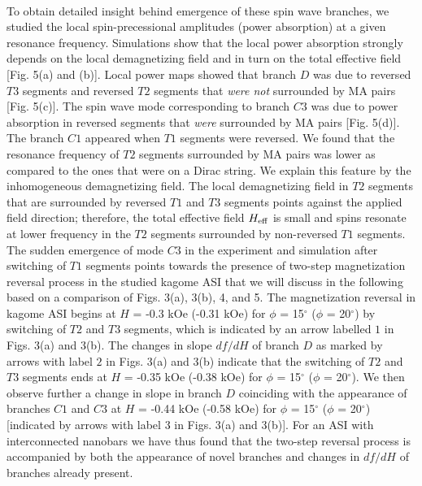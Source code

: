 \documentclass[aps,prl,preprint,showpacs,superscriptaddress,groupedaddress]{revtex4}%
\begin{document}
\\ \indent To obtain detailed insight behind emergence of these spin wave branches, we studied the local spin-precessional amplitudes (power absorption) at a given resonance frequency.  Simulations show that the local power absorption  strongly depends on the local demagnetizing field and in turn on the total effective field [Fig. 5(a) and (b)].  Local power maps showed that branch $D$ was due to reversed $T3$ segments and reversed $T2$ segments that {\em were not} surrounded by MA pairs [Fig. 5(c)]. The spin wave mode corresponding to branch $C3$ was due to power absorption in reversed segments that {\em were} surrounded by MA pairs [Fig. 5(d)]. The branch $C1$  appeared when $T1$ segments were reversed. We found that the resonance frequency of $T2$ segments surrounded by MA pairs was lower as compared to the ones that were on a Dirac string. We explain this feature by the inhomogeneous demagnetizing field. The local demagnetizing field in $T2$ segments that are surrounded by reversed $T1$ and $T3$ segments points against  the applied field direction; therefore, the total effective field $H_{\rm eff}$ is small and spins resonate at lower frequency in the $T2$ segments surrounded by non-reversed $T1$ segments. \\
The sudden emergence of mode $C3$ in the experiment and simulation after switching of $T1$ segments points towards the presence of two-step magnetization reversal process in the studied kagome ASI that we will discuss in the following based on a comparison of Figs. 3(a), 3(b), 4, and 5. The magnetization reversal in kagome ASI begins at $H$ = -0.3 kOe (-0.31 kOe) for $\phi$ = 15$^{\circ}$ ($\phi$ = 20$^{\circ}$) by switching of $T2$ and $T3$ segments, which is indicated by an arrow labelled $1$ in Figs. 3(a) and 3(b). The changes in slope $df/dH$ of branch $D$ as marked by arrows with label $2$ in Figs. 3(a) and 3(b) indicate that the switching of $T2$ and  $T3$ segments ends at $H$ = -0.35 kOe (-0.38 kOe) for  $\phi$ = 15$^{\circ}$ ($\phi$ = 20$^{\circ}$). We then observe further a change in slope in branch $D$ coinciding with the appearance of branches $C1$ and $C3$ at $H$ = -0.44 kOe (-0.58 kOe) for $\phi$ = 15$^{\circ}$ ($\phi$ = 20$^{\circ}$) [indicated by arrows with label $3$ in Figs. 3(a) and 3(b)].  For an ASI with interconnected nanobars we have thus found that the two-step reversal process is accompanied by  both the appearance of novel branches and changes in $df/dH$ of branches already present.\\
\end{document}
